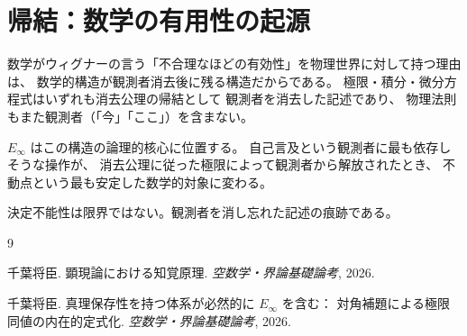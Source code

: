 \documentclass[11pt,a4paper]{article}
\theoremstyle{definition}
\newcommand{\Einfty}{E_\infty}
\begin{document}
\section{帰結：数学の有用性の起源}

数学がウィグナーの言う「不合理なほどの有効性」を物理世界に対して持つ理由は、
数学的構造が観測者消去後に残る構造だからである。
極限・積分・微分方程式はいずれも消去公理の帰結として
観測者を消去した記述であり、
物理法則もまた観測者（「今」「ここ」）を含まない。

$\Einfty$ はこの構造の論理的核心に位置する。
自己言及という観測者に最も依存しそうな操作が、
消去公理に従った極限によって観測者から解放されたとき、
不動点という最も安定した数学的対象に変わる。

決定不能性は限界ではない。観測者を消し忘れた記述の痕跡である。

\begin{thebibliography}{9}

千葉将臣.
\newblock 顕現論における知覚原理.
\newblock \emph{空数学・界論基礎論考}, 2026.

千葉将臣.
\newblock 真理保存性を持つ体系が必然的に $E_\infty$ を含む：
対角補題による極限同値の内在的定式化.
\newblock \emph{空数学・界論基礎論考}, 2026.

\end{thebibliography}
\end{document}
